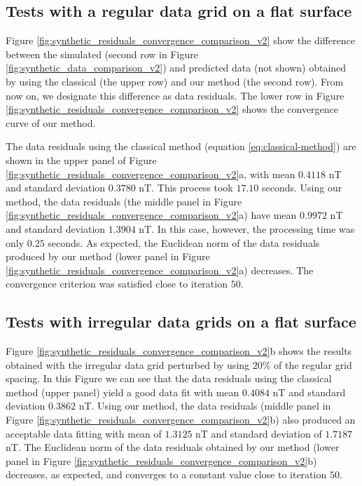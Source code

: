 \documentclass[manuscript]{geophysics}
\begin{document}
\subsection*{Tests with a regular data grid on a flat surface}

Figure \ref{fig:synthetic_residuals_convergence_comparison_v2} show the 
difference between the simulated (second row in Figure \ref{fig:synthetic_data_comparison_v2})
and predicted data (not shown) obtained by using the classical (the upper row) and 
our method (the second row). From now on, we designate this difference as data residuals. 
The lower row in Figure \ref{fig:synthetic_residuals_convergence_comparison_v2} shows the 
convergence curve of our method.

The data residuals using the classical method (equation \ref{eq:classical-method})  
are shown in the upper panel of Figure \ref{fig:synthetic_residuals_convergence_comparison_v2}a, 
with mean $0.4118$ nT and standard deviation $0.3780$ nT. This process took $17.10$ seconds.
Using our method, the data residuals (the middle panel in Figure
\ref{fig:synthetic_residuals_convergence_comparison_v2}a) have mean $0.9972$ nT and standard
deviation $1.3904$ nT. In this case, however, the processing time was only $0.25$ seconds.
As expected, the Euclidean norm of the data residuals produced by our method 
(lower panel in Figure \ref{fig:synthetic_residuals_convergence_comparison_v2}a) decreases. 
The convergence criterion was satisfied close to iteration $50$.

\subsection*{Tests with irregular data grids on a flat surface}

Figure \ref{fig:synthetic_residuals_convergence_comparison_v2}b shows the results obtained
with the irregular data grid perturbed by using $20\%$ of the regular grid spacing.
In this Figure we can see that the data residuals 
using the classical method (upper panel) yield a good data fit with mean $0.4084$ nT and standard
deviation $0.3862$ nT. 
Using our method, the data residuals (middle panel in Figure 
\ref{fig:synthetic_residuals_convergence_comparison_v2}b) also produced an acceptable data 
fitting with mean of  $1.3125$ nT and standard deviation of $1.7187$ nT. 
The Euclidean norm of the data residuals obtained by our method 
(lower panel in Figure \ref{fig:synthetic_residuals_convergence_comparison_v2}b) decreases, 
as expected, and converges to a constant value close to iteration $50$. 
\end{document}
